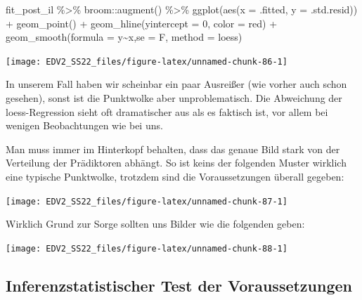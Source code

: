 \documentclass[
]{book}
\newenvironment{Shaded}{\begin{snugshade}}{\end{snugshade}}
\newcommand{\AttributeTok}[1]{\textcolor[rgb]{0.77,0.63,0.00}{#1}}
\newcommand{\DecValTok}[1]{\textcolor[rgb]{0.00,0.00,0.81}{#1}}
\newcommand{\FunctionTok}[1]{\textcolor[rgb]{0.00,0.00,0.00}{#1}}
\newcommand{\NormalTok}[1]{#1}
\newcommand{\SpecialCharTok}[1]{\textcolor[rgb]{0.00,0.00,0.00}{#1}}
\newcommand{\StringTok}[1]{\textcolor[rgb]{0.31,0.60,0.02}{#1}}
\begin{document}
\begin{Shaded}
\begin{Highlighting}[]
\NormalTok{fit\_post\_il }\SpecialCharTok{\%\textgreater{}\%} 
\NormalTok{  broom}\SpecialCharTok{::}\FunctionTok{augment}\NormalTok{() }\SpecialCharTok{\%\textgreater{}\%}
  \FunctionTok{ggplot}\NormalTok{(}\FunctionTok{aes}\NormalTok{(}\AttributeTok{x =}\NormalTok{ .fitted, }\AttributeTok{y =}\NormalTok{ .std.resid)) }\SpecialCharTok{+}
  \FunctionTok{geom\_point}\NormalTok{() }\SpecialCharTok{+}
  \FunctionTok{geom\_hline}\NormalTok{(}\AttributeTok{yintercept =} \DecValTok{0}\NormalTok{, }\AttributeTok{color =} \StringTok{\textquotesingle{}red\textquotesingle{}}\NormalTok{) }\SpecialCharTok{+}
  \FunctionTok{geom\_smooth}\NormalTok{(}\AttributeTok{formula =} \StringTok{\textquotesingle{}y\textasciitilde{}x\textquotesingle{}}\NormalTok{,}\AttributeTok{se =}\NormalTok{ F, }\AttributeTok{method =} \StringTok{\textquotesingle{}loess\textquotesingle{}}\NormalTok{)}
\end{Highlighting}
\end{Shaded}

\begin{center}\texttt{[image: EDV2\_SS22\_files/figure-latex/unnamed-chunk-86-1]} \end{center}

In unserem Fall haben wir scheinbar ein paar Ausreißer (wie vorher auch schon gesehen), sonst ist die Punktwolke aber unproblematisch. Die Abweichung der loess-Regression sieht oft dramatischer aus als es faktisch ist, vor allem bei wenigen Beobachtungen wie bei uns.

Man muss immer im Hinterkopf behalten, dass das genaue Bild stark von der Verteilung der Prädiktoren abhängt. So ist keins der folgenden Muster wirklich eine typische Punktwolke, trotzdem sind die Voraussetzungen überall gegeben:

\begin{center}\texttt{[image: EDV2\_SS22\_files/figure-latex/unnamed-chunk-87-1]} \end{center}

Wirklich Grund zur Sorge sollten uns Bilder wie die folgenden geben:

\begin{center}\texttt{[image: EDV2\_SS22\_files/figure-latex/unnamed-chunk-88-1]} \end{center}

\hypertarget{inferenzstatistischer-test-der-voraussetzungen}{%
\subsection{Inferenzstatistischer Test der Voraussetzungen}\label{inferenzstatistischer-test-der-voraussetzungen}}
\end{document}
